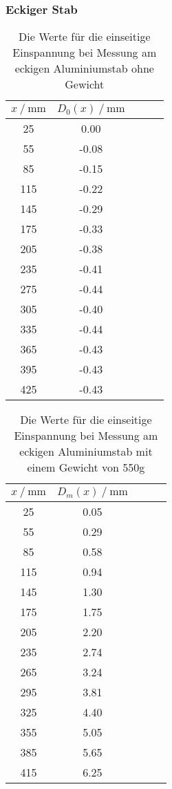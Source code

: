 \subsubsection{Eckiger Stab}
\label{sec:Eckiger Stab}

\begin{table}[H]
  \centering
  \caption{Die Werte für die einseitige Einspannung bei Messung am eckigen Aluminiumstab ohne Gewicht}
  \begin{tabular}{ccccc}
    \toprule
    {$x \mathbin{/} \unit{\milli\metre}$} &
    {$D_0(x) \mathbin{/} \unit{\milli\metre}$} \\
    \midrule
    25 & 0.00 \\
    55 & -0.08 \\
    85 & -0.15 \\
    115 & -0.22 \\
    145 & -0.29 \\
    175 & -0.33 \\   
    205 & -0.38 \\
    235 & -0.41 \\
    275 & -0.44 \\
    305 & -0.40 \\
    335 & -0.44 \\
    365 & -0.43 \\
    395 & -0.43 \\
    425 & -0.43 \\
    
    \bottomrule
  \end{tabular}
  \label{tab:Tabelle3}
\end{table}

\begin{table}[H]
  \centering
  \caption{Die Werte für die einseitige Einspannung bei Messung am eckigen Aluminiumstab mit einem Gewicht von 550g}
  \begin{tabular}{ccccc}
    \toprule
    {$x \mathbin{/} \unit{\milli\metre}$} &
    {$D_m(x) \mathbin{/} \unit{\milli\metre}$} \\
    \midrule
    25 & 0.05 \\
    55 & 0.29 \\
    85 & 0.58 \\
    115 & 0.94 \\
    145 & 1.30 \\ 
    175 & 1.75 \\
    205 & 2.20 \\    
    235 & 2.74 \\
    265 & 3.24 \\
    295 & 3.81 \\
    325 & 4.40 \\
    355 & 5.05 \\
    385 & 5.65 \\
    415 & 6.25 \\
    
    \bottomrule
  \end{tabular}
  \label{tab:Tabelle3}
\end{table}

